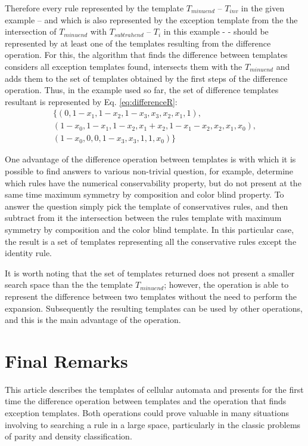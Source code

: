 \documentclass[12pt, a4paper]{article}
\begin{document}
Therefore every rule represented  by the template $T_{minuend}$ -- $T_{inv}$ in the given example -- and which is also represented by the exception template from the the intersection of $T_{minuend}$ with $T_{subtrahend}$ -- $T_i$ in this example - - should be represented by at least one of the templates resulting from the difference operation. For this, the algorithm that finds the difference between templates considers all exception templates found, intersects them with the $T_{minuend}$ and adds them to the set of templates obtained by the first steps of the difference operation. Thus, in the example used so far, the set of difference templates resultant is represented by Eq. \ref{eq:differenceR}:\begin{equation}
\begin{split}
\{(0, 1 - x_1, 1 - x_2, 1 - x_3, x_3, x_2, x_1, 1), \\
(1 - x_0, 1 - x_1, 1 - x_2, x_1 + x_2, 1 - x_1 - x_2, x_2, x_1, x_0), \\
(1 - x_0, 0, 0, 1 - x_3, x_3, 1, 1, x_0)\}
\label{eq:differenceR}
\end{split}
\end{equation}

One advantage of the difference operation between templates is with which it is possible to find answers to various non-trivial question, for example, determine which rules have the numerical conservability property, but do not present at the same time maximum symmetry by composition and color blind property. To answer the question simply pick the template of conservatives rules, and then subtract from it the intersection between the rules template with maximum symmetry by composition and the color blind template. In this particular case, the result is a set of templates representing all the conservative rules except the identity rule.

It is worth noting that the set of templates returned does not present a smaller search space than the the template $T_{minuend}$; however, the operation is able to represent the difference between two templates without the need to perform the expansion. Subsequently the resulting templates can be used by other operations, and this is the main advantage of the operation.









\section{Final Remarks}
\label{sec:consideracoes_finais}
This article describes the templates of cellular automata and presents for the first time the difference operation between templates and the operation that finds exception templates. Both operations could prove valuable in many situations involving to searching a rule in a large space, particularly in the classic problems of parity and density classification.
\end{document}
